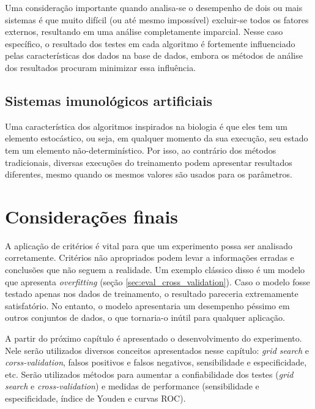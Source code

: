 Uma consideração importante quando analisa-se o desempenho de dois ou mais sistemas é que muito difícil (ou até mesmo impossível) excluir-se todos os fatores externos, resultando em uma análise completamente imparcial. Nesse caso específico, o resultado dos testes em cada algoritmo é fortemente influenciado pelas características dos dados na base de dados, embora os métodos de análise dos resultados procuram minimizar essa influência.

\subsection{Sistemas imunológicos artificiais}

Uma característica dos algoritmos inspirados na biologia é que eles tem um elemento estocástico, ou seja, em qualquer momento da sua execução, seu estado tem um elemento não-determinístico. Por isso, ao contrário dos métodos tradicionais, diversas execuções do treinamento podem apresentar resultados diferentes, mesmo quando os mesmos valores são usados para os parâmetros.

\section{Considerações finais}

A aplicação de critérios é vital para que um experimento possa ser analisado corretamente. Critérios não apropriados podem levar a informações erradas e conclusões que não seguem a realidade. Um exemplo clássico disso é um modelo que apresenta \emph{overfitting} (seção \ref{sec:eval_cross_validation}). Caso o modelo fosse testado apenas nos dados de treinamento, o resultado pareceria extremamente satisfatório. No entanto, o modelo apresentaria um desempenho péssimo em outros conjuntos de dados, o que tornaria-o inútil para qualquer aplicação.

A partir do próximo capítulo é apresentado o desenvolvimento do experimento. Nele serão utilizados diversos conceitos apresentados nesse capítulo: \emph{grid search} e \emph{corss-validation}, falsos positivos e falsos negativos, sensibilidade e especificidade, etc. Serão utilizados métodos para aumentar a confiabilidade dos testes (\emph{grid search} e \emph{cross-validation}) e medidas de performance (sensibilidade e especificidade, índice de Youden e curvas ROC).
